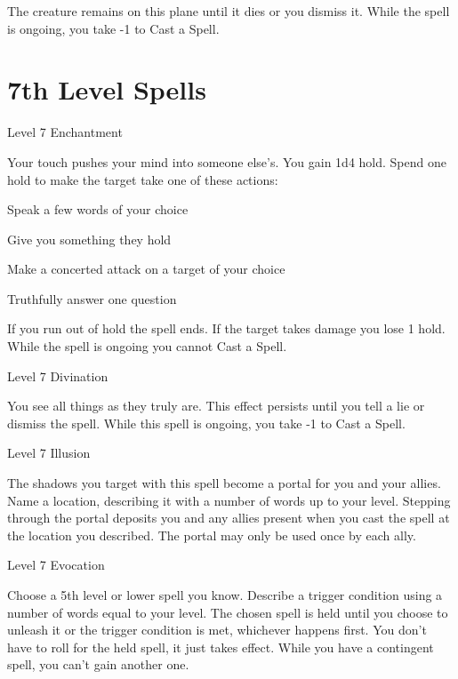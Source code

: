 The creature remains on this plane until it dies or you dismiss it. While the spell is ongoing, you take -1 to Cast a Spell.



 


\section{7th Level Spells}     
 
\startSpellName
{} 	Level 7	Enchantment
\stopSpellName
 

Your touch pushes your mind into someone else's. You gain 1d4 hold. Spend one hold to make the target take one of these actions:

 
\startitemize[1,packed]

\item Speak a few words of your choice

 
\item Give you something they hold

 
\item Make a concerted attack on a target of your choice

 
\item Truthfully answer one question


\stopitemize
 

If you run out of hold the spell ends. If the target takes damage you lose 1 hold. While the spell is ongoing you cannot Cast a Spell.

 
\startSpellName
{} 	Level 7	Divination
\stopSpellName
 

You see all things as they truly are. This effect persists until you tell a lie or dismiss the spell. While this spell is ongoing, you take -1 to Cast a Spell.

 
\startSpellName
{} 	Level 7	Illusion
\stopSpellName
 

The shadows you target with this spell become a portal for you and your allies. Name a location, describing it with a number of words up to your level. Stepping through the portal deposits you and any allies present when you cast the spell at the location you described. The portal may only be used once by each ally.

 
\startSpellName
{} 	Level 7	Evocation
\stopSpellName
 

Choose a 5th level or lower spell you know. Describe a trigger condition using a number of words equal to your level. The chosen spell is held until you choose to unleash it or the trigger condition is met, whichever happens first. You don't have to roll for the held spell, it just takes effect. While you have a contingent spell, you can't gain another one.

